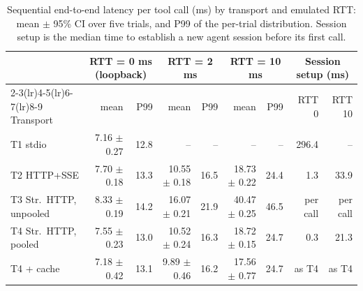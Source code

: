 \begin{table}[t]
\centering
\caption{Sequential end-to-end latency per tool call (ms) by transport and emulated RTT: mean $\pm$ 95\% CI over five trials, and P99 of the per-trial distribution. Session setup is the median time to establish a new agent session before its first call.}
\label{tab:transports}
\begin{tabular}{l rr rr rr rr}
\toprule
 & \multicolumn{2}{c}{RTT = 0 ms (loopback)} & \multicolumn{2}{c}{RTT = 2 ms} & \multicolumn{2}{c}{RTT = 10 ms} & \multicolumn{2}{c}{Session setup (ms)} \\
\cmidrule(lr){2-3}\cmidrule(lr){4-5}\cmidrule(lr){6-7}\cmidrule(lr){8-9}
Transport & mean & P99 & mean & P99 & mean & P99 & RTT 0 & RTT 10 \\
\midrule
T1 stdio & 7.16 $\pm$ 0.27 & 12.8 & -- & -- & -- & -- & 296.4 & -- \\
T2 HTTP+SSE & 7.70 $\pm$ 0.18 & 13.3 & 10.55 $\pm$ 0.18 & 16.5 & 18.73 $\pm$ 0.22 & 24.4 & 1.3 & 33.9 \\
T3 Str.\ HTTP, unpooled & 8.33 $\pm$ 0.19 & 14.2 & 16.07 $\pm$ 0.21 & 21.9 & 40.47 $\pm$ 0.25 & 46.5 & per call & per call \\
T4 Str.\ HTTP, pooled & 7.55 $\pm$ 0.23 & 13.0 & 10.52 $\pm$ 0.24 & 16.3 & 18.72 $\pm$ 0.15 & 24.7 & 0.3 & 21.3 \\
T4 + cache & 7.18 $\pm$ 0.42 & 13.1 & 9.89 $\pm$ 0.46 & 16.2 & 17.56 $\pm$ 0.77 & 24.7 & as T4 & as T4 \\
\bottomrule
\end{tabular}
\end{table}
